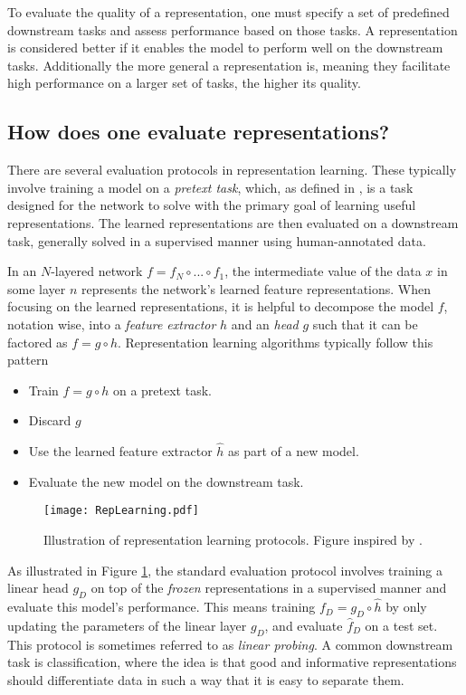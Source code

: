 \documentclass[../../thesis.tex]{subfiles}
\begin{document}
To evaluate the quality of a representation, one must specify a set of predefined downstream tasks and assess performance based on those tasks. A representation is considered better if it enables the model to perform well on the downstream tasks. Additionally the more general a representation is, meaning they facilitate high performance on a larger set of tasks, the higher its quality.

\subsection{How does one evaluate representations?}
There are several evaluation protocols in representation learning. These typically involve training a model on a \textit{pretext task}, which, as defined in \cite{jing2019selfsupervised}, is a task designed for the network to solve with the primary goal of learning useful representations. The learned representations are then evaluated on a downstream task, generally solved in a supervised manner using human-annotated data.\newline

In an $N$-layered network $f = f_N\circ ...\circ f_1$, the intermediate value of the data $x$ in some layer $n$ represents the network's learned feature representations. When focusing on the learned representations, it is helpful to decompose the model $f$, notation wise, into a \textit{feature extractor} $h$ and an \textit{head} $g$ such that it can be factored as $f = g \circ h$. Representation learning algorithms typically follow this pattern
\begin{itemize}
    \item Train $f= g \circ h$ on a pretext task.
    \item Discard $g$
    \item Use the learned feature extractor $\widehat{h}$ as part of a new model.
    \item Evaluate the new model on the downstream task. 
\end{itemize}


\begin{figure}[h]
    \texttt{[image: RepLearning.pdf]}
    \centering    
    \caption{Illustration of representation learning protocols. Figure inspired by \cite{nozawa2022empirical}.}
    \label{fig:rep_protocol}
\end{figure}


As illustrated in Figure \ref{fig:rep_protocol}, the standard evaluation protocol involves training a linear head $g_D$ on top of the \textit{frozen} representations in a supervised manner and evaluate this model's performance. This means training $f_D = g_D\circ \widehat{h}$ by only updating the parameters of the linear layer $g_D$, and evaluate $\widehat{f}_D$ on a test set. This protocol is sometimes referred to as \textit{linear probing}. A common downstream task is classification, where the idea is that good and informative representations should differentiate data in such a way that it is easy to separate them. \newline
\end{document}
